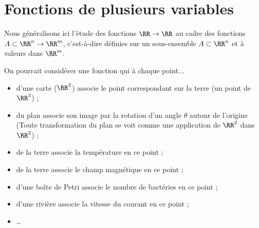 \section{Fonctions de plusieurs variables}
\begin{frame}
  Nous généralisons ici l'étude des fonctions \(\RR \to \RR\) au cadre des fonctions \(A \subset \RR^{n} \to \RR^{m}\), c'est-à-dire définies sur un sous-ensemble \(A \subset \RR^{n}\) et à valeurs dans \(\RR^{m}\).

  \begin{example}On pourrait considérer une fonction qui à chaque point...
    \begin{itemize}
    \item d'une carte (\(\RR^2\)) associe le point correspondant sur la terre (un point de \(\RR^3\)) ;\pause{}
    \item du plan associe son image par la rotation d'un angle \(\theta\) autour de l'origine\pause{} (Toute transformation du plan se voit comme une application de \(\RR^2\) dans \(\RR^2\)) ;\pause{}
    \item de la terre associe la température en ce point ;\pause{}
    \item de la terre associe le champ magnétique en ce point ;\pause{}
    \item d'une boîte de Petri associe le nombre de bactéries en ce point ;\pause{}
    \item d'une rivière associe la vitesse du courant en ce point ;\pause{}
    \item \dots
    \end{itemize}
  \end{example}
\end{frame}


